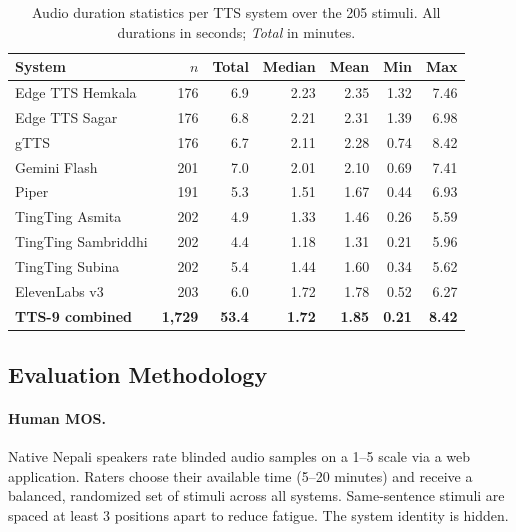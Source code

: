 \documentclass[11pt]{article}
\begin{document}
\begin{table}[h]
\centering
\caption{Audio duration statistics per TTS system over the 205 stimuli. All durations in seconds; \textit{Total} in minutes.}
\label{tab:audio_stats}
\footnotesize
\begin{tabular}{lrrrrrr}
\toprule
System & $n$ & Total & Median & Mean & Min & Max \\
\midrule
Edge TTS Hemkala       & 176 &  6.9 & 2.23 & 2.35 & 1.32 & 7.46 \\
Edge TTS Sagar         & 176 &  6.8 & 2.21 & 2.31 & 1.39 & 6.98 \\
gTTS                   & 176 &  6.7 & 2.11 & 2.28 & 0.74 & 8.42 \\
Gemini Flash           & 201 &  7.0 & 2.01 & 2.10 & 0.69 & 7.41 \\
Piper                  & 191 &  5.3 & 1.51 & 1.67 & 0.44 & 6.93 \\
TingTing Asmita        & 202 &  4.9 & 1.33 & 1.46 & 0.26 & 5.59 \\
TingTing Sambriddhi    & 202 &  4.4 & 1.18 & 1.31 & 0.21 & 5.96 \\
TingTing Subina        & 202 &  5.4 & 1.44 & 1.60 & 0.34 & 5.62 \\
ElevenLabs v3          & 203 &  6.0 & 1.72 & 1.78 & 0.52 & 6.27 \\
\midrule
\textbf{TTS-9 combined} & \textbf{1{,}729} & \textbf{53.4} & \textbf{1.72} & \textbf{1.85} & \textbf{0.21} & \textbf{8.42} \\
\bottomrule
\end{tabular}
\end{table}

\subsection{Evaluation Methodology}

\paragraph{Human MOS.} Native Nepali speakers rate blinded audio samples on a 1--5 scale via a web application. Raters choose their available time (5--20 minutes) and receive a balanced, randomized set of stimuli across all systems. Same-sentence stimuli are spaced at least 3 positions apart to reduce fatigue. The system identity is hidden.
\end{document}
